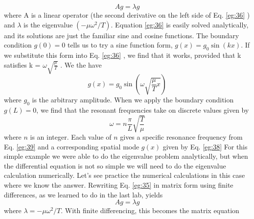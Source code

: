 \documentclass{book}
\theoremstyle{plain}
\theoremstyle{definition}
\numberwithin{exm}{chapter}
\theoremstyle{remark}
\theoremstyle{summary}
\theoremstyle{overview}
\begin{document}
				\begin{equation}\label{eq:37}
		Ag =\lambda g
				\end{equation}
				where A is a linear operator (the second derivative on the left side of Eq. \eqref{eg:36} )
and $\lambda$ is the eigenvalue $(−\mu \omega^2 / T )$.
Equation \eqref{eg:36} is easily solved analytically, and its solutions are just the familiar
sine and cosine functions. The boundary condition $g (0) = 0$ tells us to try a sine
function form, $g (x) = g_0 \sin(kx)$. If we substitute this form into Eq. \eqref{eg:36} , we find
that it works, provided that k satisfies k = $\omega \sqrt{\frac{\mu}{ T}}$ . We the have
		\begin{equation}\label{eq:38}
		g(x) = g_0\sin(\omega \sqrt{\frac{\mu}{T}x})
				\end{equation}		
				where $g_0$ is the arbitrary amplitude. When we apply the boundary condition
$g(L) = $0, we find that the resonant frequencies take on discrete values given by
\begin{equation}\label{eq:39}
		\omega = n \frac{\pi}{L}\sqrt{\frac{T}{\mu}}
				\end{equation}	
				where $n$ is an integer. Each value of $n$ gives a specific resonance frequency from
Eq. \eqref{eg:39} and a corresponding spatial mode $g(x)$ given by Eq. \eqref{eg:38}
For this simple example we were able to do the eigenvalue problem analytically, but when the differential equation is not so simple we will need to do the
eigenvalue calculation numerically. Let\rq s see practice the numerical calculations
in this case where we know the answer. Rewriting Eq. \eqref{eg:35} in matrix form using
finite differences, as we learned to do in the last lab, yields
\begin{equation}\label{eq:310}
		Ag = \lambda g
				\end{equation}
				where $ \lambda = - \mu\omega^2/T$. With finite differencing, this becomes the matrix equation
\end{document}
